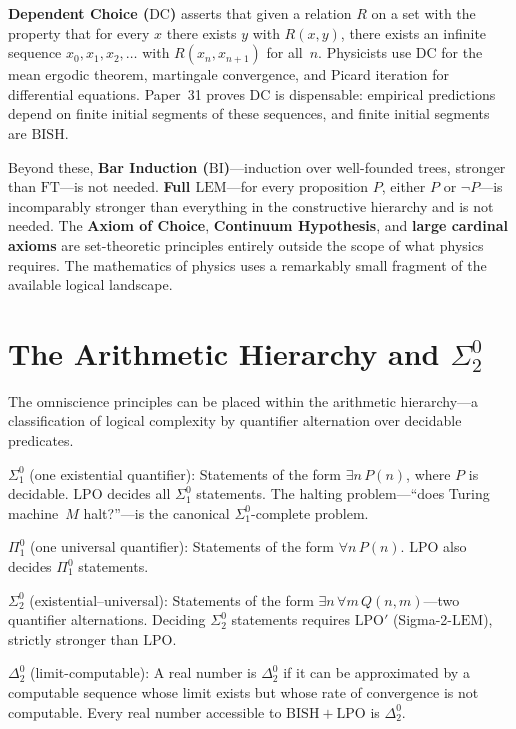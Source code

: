 \documentclass[11pt,a4paper]{report}
\theoremstyle{plain}
\theoremstyle{definition}
\theoremstyle{remark}
\newcommand{\BISH}{\mathrm{BISH}}
\newcommand{\LPO}{\mathrm{LPO}}
\newcommand{\FT}{\mathrm{FT}}
\newcommand{\DC}{\mathrm{DC}}
\newcommand{\LEM}{\mathrm{LEM}}
\newcommand{\BI}{\mathrm{BI}}
\begin{document}
\textbf{Dependent Choice ($\DC$)} asserts that given a relation $R$ on a set with the property that for every $x$ there exists $y$ with $R(x,y)$, there exists an infinite sequence $x_0, x_1, x_2, \ldots$ with $R(x_n, x_{n+1})$ for all~$n$. Physicists use $\DC$ for the mean ergodic theorem, martingale convergence, and Picard iteration for differential equations. Paper~31 proves $\DC$ is dispensable: empirical predictions depend on finite initial segments of these sequences, and finite initial segments are $\BISH$.

Beyond these, \textbf{Bar Induction ($\BI$)}---induction over well-founded trees, stronger than $\FT$---is not needed. \textbf{Full $\LEM$}---for every proposition $P$, either $P$ or $\neg P$---is incomparably stronger than everything in the constructive hierarchy and is not needed. The \textbf{Axiom of Choice}, \textbf{Continuum Hypothesis}, and \textbf{large cardinal axioms} are set-theoretic principles entirely outside the scope of what physics requires. The mathematics of physics uses a remarkably small fragment of the available logical landscape.

\section{The Arithmetic Hierarchy and $\Sigma^0_2$}

The omniscience principles can be placed within the arithmetic hierarchy---a classification of logical complexity by quantifier alternation over decidable predicates.

\textbf{$\Sigma^0_1$} (one existential quantifier): Statements of the form $\exists n\, P(n)$, where $P$ is decidable. $\LPO$ decides all $\Sigma^0_1$ statements. The halting problem---``does Turing machine~$M$ halt?''---is the canonical $\Sigma^0_1$-complete problem.

\textbf{$\Pi^0_1$} (one universal quantifier): Statements of the form $\forall n\, P(n)$. $\LPO$ also decides $\Pi^0_1$ statements.

\textbf{$\Sigma^0_2$} (existential--universal): Statements of the form $\exists n\, \forall m\, Q(n,m)$---two quantifier alternations. Deciding $\Sigma^0_2$ statements requires $\LPO'$ (Sigma-2-$\LEM$), strictly stronger than $\LPO$.

\textbf{$\Delta^0_2$} (limit-computable): A real number is $\Delta^0_2$ if it can be approximated by a computable sequence whose limit exists but whose rate of convergence is not computable. Every real number accessible to $\BISH+\LPO$ is $\Delta^0_2$.
\end{document}

